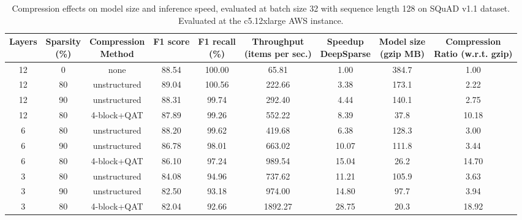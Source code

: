 \documentclass[11pt]{article}
\newcommand{\greyrule}{\arrayrulecolor{black!30}\midrule\arrayrulecolor{black}}
\begin{document}
\begin{table}[h!]
    \centering
    {\small 
    \begin{tabular}{ccccccccc}
    \toprule 
    \makecell{Layers\\\phantom{x}} & \makecell{Sparsity\\(\%)} & \makecell{Compression\\Method} & \makecell{F1 score\\\phantom{x}} & \makecell{F1 recall\\(\%)} & \makecell{Throughput\\(items per sec.)} & \makecell{Speedup\\DeepSparse} & \makecell{Model size\\ (gzip MB)} & \makecell{Compression\\Ratio (w.r.t. gzip)} \\
    \midrule
    12 & 0 & none & 88.54 & 100.00 & \phantom{11}65.81 & \phantom{1}1.00 & 384.7 & \phantom{1}1.00 \\
    \greyrule
    12 & 80 & unstructured & 89.04 & 100.56 & \phantom{1}222.66 & \phantom{1}3.38 & 173.1 & \phantom{1}2.22 \\
    12 & 90 & unstructured & 88.31 & \phantom{1}99.74 & \phantom{1}292.40 & \phantom{1}4.44 & 140.1 & \phantom{1}2.75 \\
    12 & 80 & 4-block+QAT & 87.89 & \phantom{1}99.26 & \phantom{1}552.22 & \phantom{1}8.39 & \phantom{1}37.8 & 10.18\\
    \greyrule
    6 & 80 & unstructured & 88.20 & \phantom{1}99.62 & \phantom{1}419.68 & \phantom{1}6.38 & 128.3 & \phantom{1}3.00 \\
    6 & 90 & unstructured & 86.78 & \phantom{1}98.01 & \phantom{1}663.02 & 10.07 & 111.8 & \phantom{1}3.44 \\
    6 & 80 & 4-block+QAT & 86.10 & \phantom{1}97.24 & \phantom{1}989.54 & 15.04 & \phantom{1}26.2 & 14.70\\
    \greyrule
    3 & 80 & unstructured & 84.08 & \phantom{1}94.96 & \phantom{1}737.62 & 11.21 & 105.9 & \phantom{1}3.63 \\
    3 & 90 & unstructured & 82.50 & \phantom{1}93.18 & \phantom{1}974.00 & 14.80 & \phantom{1}97.7 & \phantom{1}3.94 \\
    3 & 80 & 4-block+QAT & 82.04 & \phantom{1}92.66 & 1892.27 & 28.75 & \phantom{1}20.3 & 18.92\\
    \bottomrule
    \end{tabular}
    }
    \caption{Compression effects on model size and inference speed, evaluated at batch size 32 with sequence length 128 on SQuAD v1.1 dataset. Evaluated at the c5.12xlarge AWS instance.}
    \label{tab:deepsparseresults}
\end{table}
\end{document}
